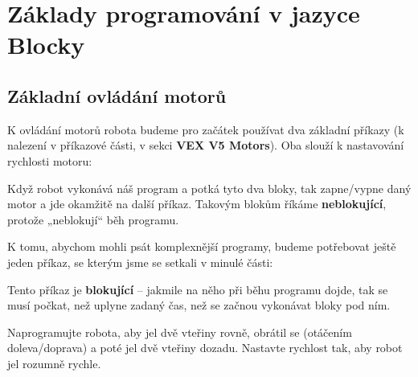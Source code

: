 \documentclass[../main.tex]{subfiles}
\begin{document}
	\section{Základy programování v jazyce Blocky}


	\subsection{Základní ovládání motorů}
	K ovládání motorů robota budeme pro začátek používat dva základní příkazy (k nalezení v příkazové části, v sekci \textbf{VEX V5 Motors}). Oba slouží k nastavování rychlosti motoru:
	\begin{itemize}
		\blockMotorStart
		\blockMotorStop
	\end{itemize}

	Když robot vykonává náš program a potká tyto dva bloky, tak zapne/vypne daný motor a jde okamžitě na další příkaz. Takovým blokům říkáme \textbf{neblokující}, protože „neblokují“ běh programu.

	K tomu, abychom mohli psát komplexnější programy, budeme potřebovat ještě jeden příkaz, se kterým jsme se setkali v minulé části:
	\begin{itemize}
		\blockWait
	\end{itemize}

	Tento příkaz je \textbf{blokující} -- jakmile na něho při běhu programu dojde, tak se musí počkat, než uplyne zadaný čas, než se začnou vykonávat bloky pod ním.

	\begin{question}
		Naprogramujte robota, aby jel dvě vteřiny rovně, obrátil se (otáčením doleva/doprava) a poté jel dvě vteřiny dozadu. Nastavte rychlost tak, aby robot jel rozumně rychle.
	\end{question}
\end{document}
